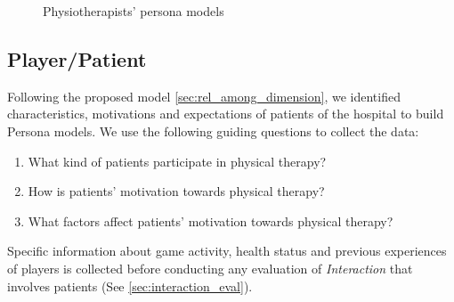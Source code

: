\begin{figure}[bth]
\centering
\caption{Physiotherapists' persona models}
\label{fig:physio_personas}
\end{figure}

\subsection{Player/Patient}
Following the proposed model \autoref{sec:rel_among_dimension}, we identified characteristics, motivations and expectations of patients of the hospital to build Persona models. We use the following guiding questions to collect the data:

\begin{enumerate}
    \item What kind of patients participate in physical therapy?
    \item How is patients' motivation towards physical therapy?
    \item What factors affect patients' motivation towards physical therapy?
\end{enumerate}


Specific information about game activity, health status and previous experiences of players is collected before conducting any evaluation of \emph{Interaction} that involves patients (See \autoref{sec:interaction_eval}).

